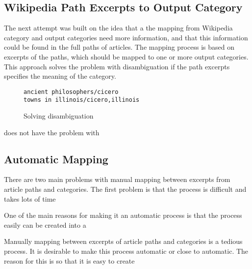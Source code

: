 \subsection{Wikipedia Path Excerpts to Output Category}
The next attempt was built on the idea that a the mapping from Wikipedia category and output categories need more information, and that this information could be found in the full paths of articles. The mapping process is based on excerpts of the paths, which should be mapped to one or more output categories. This approach solves the problem with disambiguation if the path excerpts specifies the meaning of the category. 

\begin{figure}
\centering
\begin{lstlisting}
ancient philosophers/cicero
towns in illinois/cicero,illinois
\end{lstlisting}
\caption{Solving disambiguation}
\label{fig:solving_disambiguation}
\end{figure}


does not have the problem with 

\subsection{Automatic Mapping}
There are two main problems with manual mapping between excerpts from article paths and categories. The first problem is that the process is difficult and takes lots of time

One of the main reasons for making it an automatic process is that the process easily can be created into a 


Manually mapping between excerpts of article paths and categories is a tedious process. It is desirable to make this  process automatic or close to automatic. The reason for this is so that it is easy to create 


